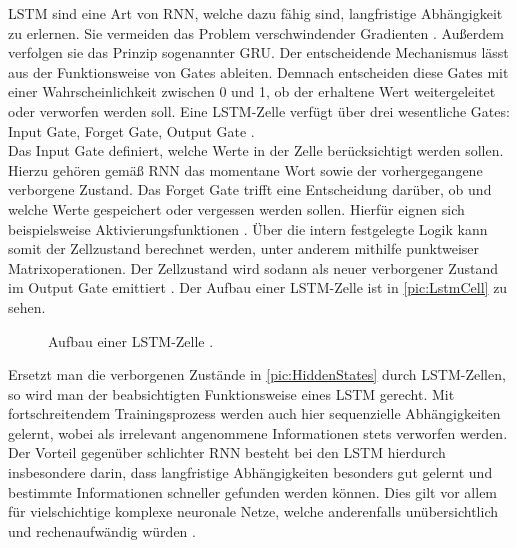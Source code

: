 \noindent
\ac{LSTM} sind eine Art von \ac{RNN}, welche dazu fähig sind, langfristige Abhängigkeit zu erlernen. Sie vermeiden das Problem verschwindender Gradienten \cite{AIU19}. Außerdem verfolgen sie das Prinzip sogenannter \ac{GRU}. Der entscheidende Mechanismus lässt aus der Funktionsweise von Gates ableiten. Demnach entscheiden diese Gates mit einer Wahrscheinlichkeit zwischen 0 und 1, ob der erhaltene Wert weitergeleitet oder verworfen werden soll. Eine \ac{LSTM}-Zelle verfügt über drei wesentliche Gates: Input Gate, Forget Gate, Output Gate \cite[S.~347-348]{ZHA20}.\\

\noindent
Das Input Gate definiert, welche Werte in der Zelle berücksichtigt werden sollen. Hierzu gehören gemäß \ac{RNN} das momentane Wort sowie der vorhergegangene verborgene Zustand. Das Forget Gate trifft eine Entscheidung darüber, ob und welche Werte gespeichert oder vergessen werden sollen. Hierfür eignen sich beispielsweise Aktivierungsfunktionen \cite[S.~355]{ZHA20}. Über die intern festgelegte Logik kann somit der Zellzustand berechnet werden, unter anderem mithilfe punktweiser Matrixoperationen. Der Zellzustand wird sodann als neuer verborgener Zustand im Output Gate emittiert \cite{LUB18}. Der Aufbau einer \ac{LSTM}-Zelle ist in \autoref{pic:LstmCell} zu sehen.
\newpage

\begin{figure}[h!]
  \centering
  \caption{Aufbau einer LSTM-Zelle \cite[S.~357]{ZHA20}.}
  \label{pic:LstmCell}
\end{figure}

\noindent
Ersetzt man die verborgenen Zustände in \autoref{pic:HiddenStates} durch \ac{LSTM}-Zellen, so wird man der beabsichtigten Funktionsweise eines \ac{LSTM} gerecht. Mit fortschreitendem Trainingsprozess werden auch hier sequenzielle Abhängigkeiten gelernt, wobei als irrelevant angenommene Informationen stets verworfen werden. Der Vorteil gegenüber schlichter \ac{RNN} besteht bei den \ac{LSTM} hierdurch insbesondere darin, dass langfristige Abhängigkeiten besonders gut gelernt und bestimmte Informationen schneller gefunden werden können. Dies gilt vor allem für vielschichtige komplexe neuronale Netze, welche anderenfalls unübersichtlich und rechenaufwändig würden \cite{LUB18}.\\

